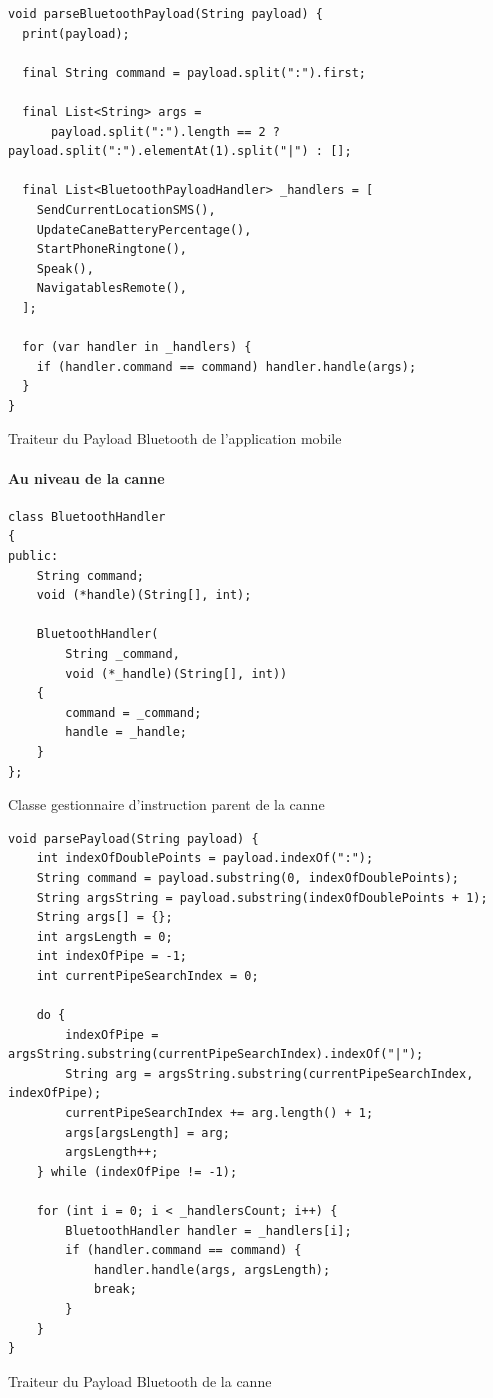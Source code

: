 \begin{code}
\begin{verbatim}
void parseBluetoothPayload(String payload) {
  print(payload);

  final String command = payload.split(":").first;

  final List<String> args =
      payload.split(":").length == 2 ? payload.split(":").elementAt(1).split("|") : [];

  final List<BluetoothPayloadHandler> _handlers = [
    SendCurrentLocationSMS(),
    UpdateCaneBatteryPercentage(),
    StartPhoneRingtone(),
    Speak(),
    NavigatablesRemote(),
  ];

  for (var handler in _handlers) {
    if (handler.command == command) handler.handle(args);
  }
}
\end{verbatim}
\caption{Traiteur du Payload Bluetooth de l'application mobile}
\end{code}

\paragraph{Au niveau de la canne}

\begin{code}
\begin{verbatim}
class BluetoothHandler
{
public:
    String command;
    void (*handle)(String[], int);

    BluetoothHandler(
        String _command,
        void (*_handle)(String[], int))
    {
        command = _command;
        handle = _handle;
    }
};
\end{verbatim}
\caption{Classe gestionnaire d'instruction parent de la canne}
\end{code}

\begin{code}
\begin{verbatim}
void parsePayload(String payload) {
    int indexOfDoublePoints = payload.indexOf(":");
    String command = payload.substring(0, indexOfDoublePoints);
    String argsString = payload.substring(indexOfDoublePoints + 1);
    String args[] = {};
    int argsLength = 0;
    int indexOfPipe = -1;
    int currentPipeSearchIndex = 0;

    do {
        indexOfPipe = argsString.substring(currentPipeSearchIndex).indexOf("|");
        String arg = argsString.substring(currentPipeSearchIndex, indexOfPipe);
        currentPipeSearchIndex += arg.length() + 1;
        args[argsLength] = arg;
        argsLength++;
    } while (indexOfPipe != -1);

    for (int i = 0; i < _handlersCount; i++) {
        BluetoothHandler handler = _handlers[i];
        if (handler.command == command) {
            handler.handle(args, argsLength);
            break;
        }
    }
}
\end{verbatim}
\caption{Traiteur du Payload Bluetooth de la canne}
\end{code}

